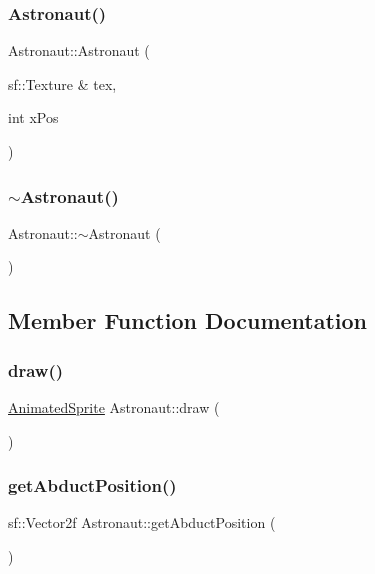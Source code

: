 \subsubsection{\texorpdfstring{Astronaut()}{Astronaut()}}
{\footnotesize\ttfamily Astronaut\+::\+Astronaut (\begin{DoxyParamCaption}\item[{sf\+::\+Texture \&}]{tex,  }\item[{int}]{x\+Pos }\end{DoxyParamCaption})}

\mbox{\label{class_astronaut_af31f9de205719a042df5f0a1879ee064}} 
\subsubsection{\texorpdfstring{$\sim$\+Astronaut()}{~Astronaut()}}
{\footnotesize\ttfamily Astronaut\+::$\sim$\+Astronaut (\begin{DoxyParamCaption}{ }\end{DoxyParamCaption})}



\subsection{Member Function Documentation}
\mbox{\label{class_astronaut_a0dca06c39c27c2f451de64bbc1785d0a}} 
\subsubsection{\texorpdfstring{draw()}{draw()}}
{\footnotesize\ttfamily \hyperlink{class_animated_sprite}{Animated\+Sprite} Astronaut\+::draw (\begin{DoxyParamCaption}{ }\end{DoxyParamCaption})}

\mbox{\label{class_astronaut_a7b30fc496f4f8bb28770b05c641222a1}} 
\subsubsection{\texorpdfstring{get\+Abduct\+Position()}{getAbductPosition()}}
{\footnotesize\ttfamily sf\+::\+Vector2f Astronaut\+::get\+Abduct\+Position (\begin{DoxyParamCaption}{ }\end{DoxyParamCaption})}

